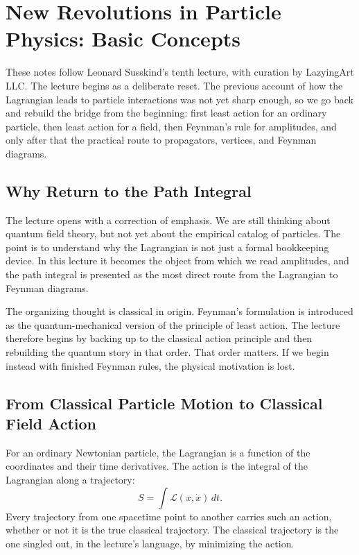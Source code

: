 \chapter{New Revolutions in Particle Physics: Basic Concepts}

These notes follow Leonard Susskind's tenth lecture, with curation by LazyingArt LLC. The lecture begins as a deliberate reset. The previous account of how the Lagrangian leads to particle interactions was not yet sharp enough, so we go back and rebuild the bridge from the beginning: first least action for an ordinary particle, then least action for a field, then Feynman's rule for amplitudes, and only after that the practical route to propagators, vertices, and Feynman diagrams.

\section{Why Return to the Path Integral}

The lecture opens with a correction of emphasis. We are still thinking about quantum field theory, but not yet about the empirical catalog of particles. The point is to understand why the Lagrangian is not just a formal bookkeeping device. In this lecture it becomes the object from which we read amplitudes, and the path integral is presented as the most direct route from the Lagrangian to Feynman diagrams.

The organizing thought is classical in origin. Feynman's formulation is introduced as the quantum-mechanical version of the principle of least action. The lecture therefore begins by backing up to the classical action principle and then rebuilding the quantum story in that order. That order matters. If we begin instead with finished Feynman rules, the physical motivation is lost.

\section{From Classical Particle Motion to Classical Field Action}

For an ordinary Newtonian particle, the Lagrangian is a function of the coordinates and their time derivatives. The action is the integral of the Lagrangian along a trajectory:
\begin{equation}
S=\int \mathcal{L}(x,\dot{x})\,dt.
\end{equation}
Every trajectory from one spacetime point to another carries such an action, whether or not it is the true classical trajectory. The classical trajectory is the one singled out, in the lecture's language, by minimizing the action.

